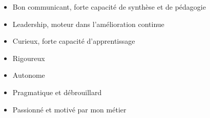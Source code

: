 %
%
%

\twocolumnsection
{
\begin{skills}
\end{skills}}
{
\vspace{1em}
\begin{itemize}
	\item Bon communicant, forte capacité de synthèse et de pédagogie
    \item Leadership, moteur dans l'amélioration continue
    \item Curieux, forte capacité d'apprentissage
	\item Rigoureux
    \item Autonome
    \item Pragmatique et débrouillard
	\item Passionné et motivé par mon métier
\end{itemize}
}
